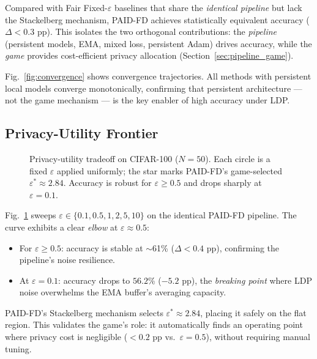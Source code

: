 Compared with Fair Fixed-$\varepsilon$ baselines that share the
\emph{identical pipeline} but lack the Stackelberg mechanism,
PAID-FD achieves statistically equivalent accuracy
($\Delta < 0.3$ pp).
This isolates the two orthogonal contributions:
the \emph{pipeline} (persistent models, EMA, mixed loss, persistent Adam)
drives accuracy, while the \emph{game} provides cost-efficient
privacy allocation (Section~\ref{sec:pipeline_game}).

Fig.~\ref{fig:convergence} shows convergence trajectories.
All methods with persistent local models converge monotonically,
confirming that persistent architecture --- not the game mechanism ---
is the key enabler of high accuracy under LDP.

\subsection{Privacy-Utility Frontier}\label{sec:privacy_utility}

\begin{figure}[t]
\centering
\caption{Privacy-utility tradeoff on CIFAR-100 ($N = 50$).
Each circle is a fixed $\varepsilon$ applied uniformly;
the star marks PAID-FD's game-selected $\varepsilon^* \approx 2.84$.
Accuracy is robust for $\varepsilon \geq 0.5$ and drops sharply
at $\varepsilon = 0.1$.}
\label{fig:privacy_utility}
\end{figure}

Fig.~\ref{fig:privacy_utility} sweeps $\varepsilon \in \{0.1, 0.5, 1, 2, 5, 10\}$
on the identical PAID-FD pipeline.
The curve exhibits a clear \emph{elbow} at $\varepsilon \approx 0.5$:
\begin{itemize}
    \item For $\varepsilon \geq 0.5$: accuracy is stable at $\sim$61\%
          ($\Delta < 0.4$ pp), confirming the pipeline's noise resilience.
    \item At $\varepsilon = 0.1$: accuracy drops to $56.2\%$ ($-5.2$ pp),
          the \emph{breaking point} where LDP noise overwhelms the
          EMA buffer's averaging capacity.
\end{itemize}
PAID-FD's Stackelberg mechanism selects $\varepsilon^* \approx 2.84$,
placing it safely on the flat region.
This validates the game's role: it automatically finds an operating point
where privacy cost is negligible ($< 0.2$ pp vs.\ $\varepsilon = 0.5$),
without requiring manual tuning.


